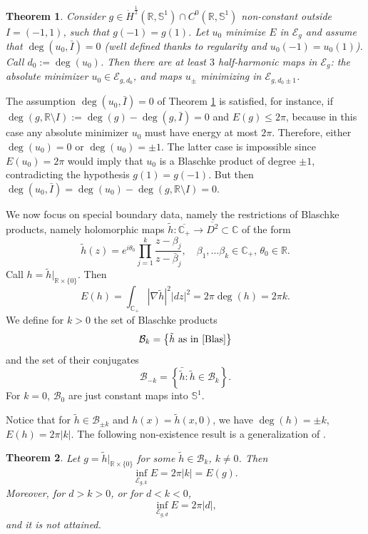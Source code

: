 \documentclass[12pt, a4paper]{article}
\newtheorem{thm}{Theorem}[section]
\newcommand{\M}[1]{\mathcal{#1}}
\newcommand{\sph}{\mathbb{S}}
\newcommand{\R}{\mathbb{R}}
\newcommand{\cl}[1]{\overline{#1}}
\renewcommand{\(}{\left(}
\renewcommand{\)}{\right)}
\begin{document}
\begin{thm}\label{exist3} Consider $g\in \dot H^{\frac12}(\R,\sph^1)\cap C^0(\R,\sph^1)$ non-constant outside $I=(-1,1)$, such that $g(-1)=g(1)$. Let $u_0$ minimize $E$ in $\M{E}_{g}$ and assume that $\deg(u_0,\bar I)=0$ (well defined thanks to regularity and $u_0(-1)=u_0(1)$). Call $d_0:=\deg(u_0)$. Then there are at least $3$ half-harmonic maps {in $\M{E}_g$}: the absolute minimizer $u_0\in \M{E}_{g,d_0}$, and maps $u_{\pm}$ minimizing in $\mathcal{E}_{g,d_0\pm 1}$.
\end{thm}

The assumption $\deg(u_0,\bar I)=0$ of Theorem \ref{exist3} is satisfied, for instance, if $\deg(g,\R\setminus I):=\deg(g)-\deg(g,\bar I)=0$ and $E(g)\le 2\pi$, because in this case any absolute minimizer $u_0$ must have energy at most $2\pi$. Therefore,   either $\deg(u_0)=0$ or  $\deg(u_0)=\pm1$.  The latter case is impossible since $E(u_0)=2\pi$  would imply that $u_0$ is a  Blaschke product of degree $\pm1$, contradicting the hypothesis $g(1)=g(-1)$. But then $\deg(u_0,\bar I)=\deg(u_0)-\deg(g,\R\setminus I)=0$.

\medskip

We now focus on special boundary data, namely the restrictions of Blaschke products, namely holomorphic maps $\tilde h:\cl{\mathbb{C}_+}\to \cl{D^2} \subset \mathbb{C}$ of the form
\begin{equation}\label{Blas}
\tilde h(z)= e^{i\theta_0}\prod_{j=1}^k\frac{z-\beta_j}{z-\bar \beta_j},\quad \beta_1,\dots\beta_k\in \mathbb{C}_+,\, \theta_0\in \R.
\end{equation}
Call $h=\tilde h|_{\R\times\{0\}}$. Then
$$E(h)=\int_{\mathbb{C}_+} |\nabla \tilde h|^2 |dz|^2 =2\pi \deg (h)=2\pi k.$$
We define for $k>0$ the set of Blaschke products
$$\M{B}_k=\left\{\tilde h\text{ as in }\eqref{Blas}\right\} $$
and the set of their conjugates
$$\M{B}_{-k}=\left\{\bar{\tilde h}: \tilde h \in \M{B}_k\right\}.$$
For $k=0$, $\M{B}_0$ are just constant maps into $\sph^1$.

\medskip

Notice that for $\tilde h\in \M{B}_{\pm k}$ and $h(x)=\tilde h(x,0)$, we have $\deg(h)=\pm k$, $E(h)=2\pi|k|$.
The following non-existence result is a generalization of \cite[Thm. 1.3]{HM}.


\begin{thm}\label{thmBl} Let $g=\tilde h|_{\R\times\{0\}}$ for some $\tilde h\in \mathcal{B}_k$, $k\ne 0$. Then
\begin{equation}\label{enBla}
\inf_{\mathcal{E}_{g,k}} E= 2\pi |k| = E(g).
\end{equation}
Moreover, for $d>k>0$, or for $d<k<0$,
\begin{equation}\label{enBla2}
\inf_{\mathcal{E}_{g,d}} E= 2\pi |d|,
\end{equation}
and it is not attained.
\end{thm}
\end{document}
